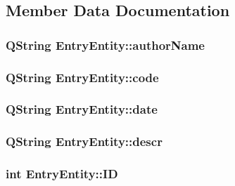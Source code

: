 \subsection{Member Data Documentation}
\hypertarget{class_entry_entity_abeb114f6b0cfe1678a36e998e21434bf}{
\subsubsection[{author\+Name}]{\setlength{\rightskip}{0pt plus 5cm}Q\+String Entry\+Entity\+::author\+Name\hspace{0.3cm}{\ttfamily [private]}}}\label{class_entry_entity_abeb114f6b0cfe1678a36e998e21434bf}
\hypertarget{class_entry_entity_a12393012ebcfc513af6eda5d95d9ccdb}{
\subsubsection[{code}]{\setlength{\rightskip}{0pt plus 5cm}Q\+String Entry\+Entity\+::code\hspace{0.3cm}{\ttfamily [private]}}}\label{class_entry_entity_a12393012ebcfc513af6eda5d95d9ccdb}
\hypertarget{class_entry_entity_ad5ebe98873fec2e521b5df2b31a4b7b6}{
\subsubsection[{date}]{\setlength{\rightskip}{0pt plus 5cm}Q\+String Entry\+Entity\+::date\hspace{0.3cm}{\ttfamily [private]}}}\label{class_entry_entity_ad5ebe98873fec2e521b5df2b31a4b7b6}
\hypertarget{class_entry_entity_ae87c35927889353ff5739e1fabe499bb}{
\subsubsection[{descr}]{\setlength{\rightskip}{0pt plus 5cm}Q\+String Entry\+Entity\+::descr\hspace{0.3cm}{\ttfamily [private]}}}\label{class_entry_entity_ae87c35927889353ff5739e1fabe499bb}
\hypertarget{class_entry_entity_a0353f8e056e80e3277f1cc6c17d2e071}{
\subsubsection[{I\+D}]{\setlength{\rightskip}{0pt plus 5cm}int Entry\+Entity\+::\+I\+D\hspace{0.3cm}{\ttfamily [private]}}}\label{class_entry_entity_a0353f8e056e80e3277f1cc6c17d2e071}
